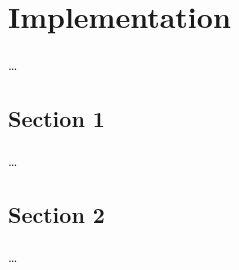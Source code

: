 
\chapter{Implementation}
\label{ch:implementation}
\ldots

\section{Section 1}
\label{ch:implementation:sec:section1}

\ldots

\section{Section 2}
\label{ch:implementation:sec:section2}

\ldots

